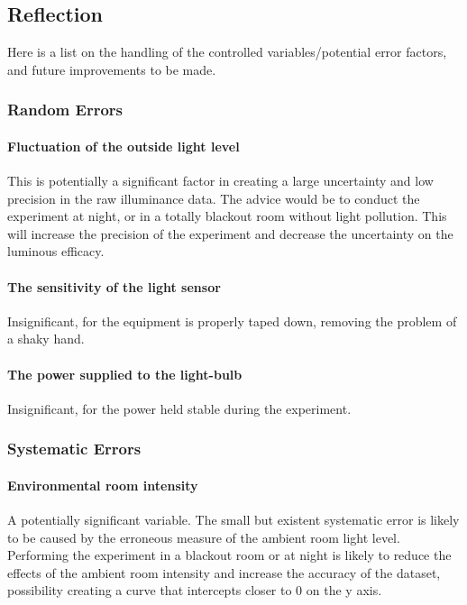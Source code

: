 \documentclass[a4paper,12pt]{article}
\begin{document}

\subsection{Reflection}

Here is a list on the handling of the controlled variables/potential error factors, and future improvements to be made.

\subsubsection{Random Errors}
\paragraph{Fluctuation of the outside light level} This is potentially a significant factor in creating a large uncertainty and low precision in the raw illuminance data. The advice would be to conduct the experiment at night, or in a totally blackout room without light pollution. This will increase the precision of the experiment and decrease the uncertainty on the luminous efficacy.

\paragraph{The sensitivity of the light sensor} Insignificant, for the equipment is properly taped down, removing the problem of a shaky hand.

\paragraph{The power supplied to the light-bulb}
Insignificant, for the power held stable during the experiment.

\subsubsection{Systematic Errors}
\paragraph{Environmental room intensity}
A potentially significant variable. The small but existent systematic error is likely to be caused by the erroneous measure of the ambient room light level. Performing the experiment in a blackout room or at night is likely to reduce the effects of the ambient room intensity and increase the accuracy of the dataset, possibility creating a curve that intercepts closer to 0 on the y axis.
\end{document}
